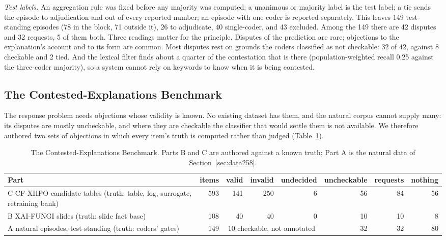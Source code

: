 \documentclass[preprint,12pt,3p,times]{elsarticle}
\begin{document}
\emph{Test labels.} An aggregation rule was fixed before any majority was computed: a unanimous or majority label is the test label; a tie sends the episode to adjudication and out of every reported number; an episode with one coder is reported separately. This leaves 149 test-standing episodes (78 in the block, 71 outside it), 26 to adjudicate, 40 single-coder, and 43 excluded. Among the 149 there are 42 disputes and 32 requests, 5 of them both. Three readings matter for the principle. Disputes of the prediction are rare; objections to the explanation's account and to its form are common. Most disputes rest on grounds the coders classified as not checkable: 32 of 42, against 8 checkable and 2 tied. And the lexical filter finds about a quarter of the contestation that is there (population-weighted recall 0.25 against the three-coder majority), so a system cannot rely on keywords to know when it is being contested.

\subsection{The Contested-Explanations Benchmark}
\label{sec:benchmark}

The response problem needs objections whose validity is known. No existing dataset has them, and the natural corpus cannot supply many: its disputes are mostly uncheckable, and where they are checkable the classifier that would settle them is not available. We therefore authored two sets of objections in which every item's truth is computed rather than judged (Table~\ref{tab:benchmark}).

\begin{table}[t]
\centering
\caption{The Contested-Explanations Benchmark. Parts B and C are authored against a known truth; Part A is the natural data of Section~\ref{sec:data258}.}
\label{tab:benchmark}
\small
\begin{tabular}{lrrrrrrr}
\toprule
Part & items & valid & invalid & undecided & uncheckable & requests & nothing \\
\midrule
C\; CF-XHPO candidate tables (truth: table, log, surrogate, retraining bank) & 593 & 141 & 250 & 6 & 56 & 84 & 56 \\
B\; XAI-FUNGI slides (truth: slide fact base) & 108 & 40 & 40 & 0 & 10 & 10 & 8 \\
A\; natural episodes, test-standing (truth: coders' gates) & 149 & \multicolumn{3}{c}{10 checkable, not annotated} & 32 & 32 & 80 \\
\bottomrule
\end{tabular}
\end{table}
\end{document}
